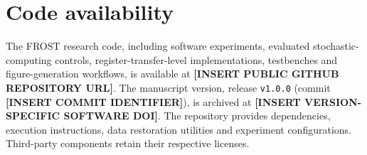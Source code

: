 \section*{Code availability}

The FROST research code, including software experiments, evaluated
stochastic-computing controls, register-transfer-level implementations,
testbenches and figure-generation workflows, is available at
\textbf{[INSERT PUBLIC GITHUB REPOSITORY URL]}.
The manuscript version, release \texttt{v1.0.0}
(commit \textbf{[INSERT COMMIT IDENTIFIER]}), is archived at
\textbf{[INSERT VERSION-SPECIFIC SOFTWARE DOI]}.
The repository provides dependencies, execution instructions, data
restoration utilities and experiment configurations. Third-party
components retain their respective licenses.
